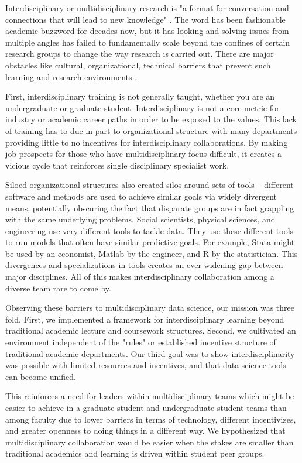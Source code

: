 \documentclass{sig-alternate}
\begin{document}
Interdisciplinary or multidisciplinary research is "a format for conversation and connections that will lead to new knowledge" \cite{repko2008interdisciplinary}. The word has been fashionable academic buzzword for decades now, but it has looking and solving issues from multiple angles has failed to fundamentally scale beyond the confines of certain research groups to change the way research is carried out. There are major obstacles like cultural, organizational, technical barriers that prevent such learning and research environments \cite{eisenberg2000bridging}.

First, interdisciplinary training is not generally taught, whether you are an undergraduate or graduate student. Interdisciplinary is not a core metric for industry or academic career paths in order to be exposed to the values. This lack of training has to due in part to organizational structure with many departments providing little to no incentives for interdisciplinary collaborations. By making job prospects for those who have multidisciplinary focus difficult, it creates a vicious cycle that reinforces single disciplinary specialist work. 

Siloed organizational structures also created silos around sets of tools -- different software and methods are used to achieve similar goals via widely divergent means, potentially obscuring the fact that disparate groups are in fact grappling with the same underlying problems. Social scientists, physical sciences, and engineering use very different tools to tackle data. They use these different tools to run models that often have similar predictive goals. For example, Stata \cite{stata2005stata} might be used by an economist, Matlab\cite{incorporation2005matlab}  by the engineer, and R by the statistician. This divergences and specializations in tools creates an ever widening gap between major disciplines.  All of this makes interdisciplinary collaboration among a diverse team rare to come by.

Observing  these barriers to multidisciplinary data science, our mission was three fold. First, we implemented a framework for interdisciplinary learning beyond traditional academic lecture and coursework structures. Second, we cultivated an environment independent of the "rules" or established incentive structure of traditional academic departments. Our third goal was to show interdisciplinarity was possible with limited resources and incentives, and that data science tools can become unified. 

This reinforces a need for leaders within multidisciplinary teams which might be easier to achieve in a graduate student and undergraduate student teams than among faculty due to lower barriers in terms of technology, different incentivizes, and greater openness to doing things in a different way. We hypothesized that multidisciplinary collaboration would be easier when the stakes are smaller than traditional academics and learning is driven within student peer groups.
\end{document}
